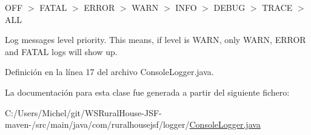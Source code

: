 {\ttfamily O\+FF $>$ F\+A\+T\+AL $>$ E\+R\+R\+OR $>$ W\+A\+RN $>$ I\+N\+FO $>$ D\+E\+B\+UG $>$ T\+R\+A\+CE $>$ A\+LL} 

Log messages level priority. This means, if level is {\ttfamily W\+A\+RN}, only {\ttfamily W\+A\+RN}, {\ttfamily E\+R\+R\+OR} and {\ttfamily F\+A\+T\+AL} logs will show up. 

Definición en la línea 17 del archivo Console\+Logger.\+java.



La documentación para esta clase fue generada a partir del siguiente fichero\+:\begin{DoxyCompactItemize}
\item 
C\+:/\+Users/\+Michel/git/\+W\+S\+Rural\+House-\/\+J\+S\+F-\/maven-\//src/main/java/com/ruralhousejsf/logger/\mbox{\hyperlink{_console_logger_8java}{Console\+Logger.\+java}}\end{DoxyCompactItemize}
